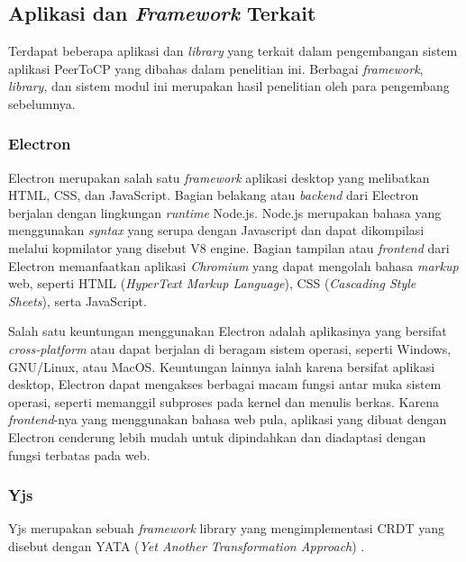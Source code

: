 \chapter{\babEmpat}
\label{bab:4}

\section{Aplikasi dan \textit{Framework} Terkait}

Terdapat beberapa aplikasi dan \textit{library} yang terkait dalam pengembangan sistem aplikasi PeerToCP yang dibahas dalam penelitian ini. Berbagai \textit{framework}, \textit{library}, dan sistem modul ini merupakan hasil penelitian oleh para pengembang sebelumnya.

\subsection{Electron}

Electron merupakan salah satu \textit{framework} aplikasi desktop yang melibatkan HTML, CSS, dan JavaScript. Bagian belakang atau \textit{backend} dari Electron berjalan dengan lingkungan \textit{runtime} Node.js. Node.js merupakan bahasa yang menggunakan \textit{syntax} yang serupa dengan Javascript dan dapat dikompilasi melalui kopmilator yang disebut V8 engine. Bagian tampilan atau \textit{frontend} dari Electron memanfaatkan aplikasi \textit{Chromium} yang dapat mengolah bahasa \textit{markup} web, seperti HTML (\textit{HyperText Markup Language}), CSS (\textit{Cascading Style Sheets}), serta JavaScript.

Salah satu keuntungan menggunakan Electron adalah aplikasinya yang bersifat \textit{cross-platform} atau dapat berjalan di beragam sistem operasi, seperti Windows, GNU/Linux, atau MacOS. Keuntungan lainnya ialah karena bersifat aplikasi desktop, Electron dapat mengakses berbagai macam fungsi antar muka sistem operasi, seperti memanggil subproses pada kernel dan menulis berkas. Karena \textit{frontend}-nya yang menggunakan bahasa web pula, aplikasi yang dibuat dengan Electron cenderung lebih mudah untuk dipindahkan dan diadaptasi dengan fungsi terbatas pada web.

\subsection{Yjs}

Yjs merupakan sebuah \textit{framework} library yang mengimplementasi CRDT yang disebut dengan YATA (\textit{Yet Another Transformation Approach}) \citep{Nicolaescu2016yjs}.

